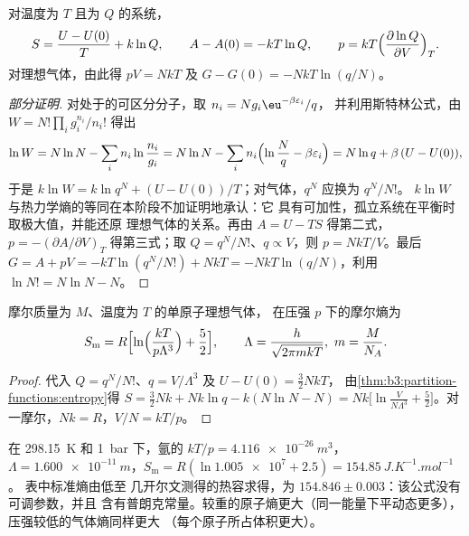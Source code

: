\begin{theorem}[熵与其他函数]\label{thm:b3:partition-functions:entropy}
对温度为 $T$ 且为 $Q$ 的系统，
\[
  S = \frac{U - U(0)}{T} + k\ln Q, \qquad A - A(0) = -kT\ln Q, \qquad
  p = kT\Bigl(\frac{\partial\ln Q}{\partial V}\Bigr)_T .
\]
对理想气体，由此得 $pV = NkT$ 及 $G - G(0) = -NkT\ln(q/N)$。
\end{theorem}

\begin{proof}[部分证明]
对处于的可区分分子，取 $n_i = Ng_i\eu^{-\beta\varepsilon_i}/q$，
并利用斯特林公式，由 $W = N!\prod_ig_i^{n_i}/n_i!$ 得出
\[
  \ln W = N\ln N - \sum_in_i\ln\frac{n_i}{g_i} = N\ln N - \sum_in_i\Bigl(\ln\frac Nq - \beta\varepsilon_i\Bigr)
        = N\ln q + \beta\,(U - U(0)),
\]
于是 $k\ln W = k\ln q^N + (U - U(0))/T$；对气体，$q^N$ 应换为 $q^N/N!$。
$k\ln W$ 与热力学熵的等同在本阶段不加证明地承认：它
具有可加性，孤立系统在平衡时取极大值，并能还原
理想气体的关系。再由 $A = U - TS$ 得第二式，$p =
-(\partial A/\partial V)_T$ 得第三式；取 $Q = q^N/N!$、$q \propto V$，则 $p = NkT/V$。最后
$G = A + pV = -kT\ln(q^N/N!) + NkT = -NkT\ln(q/N)$，利用 $\ln N! = N\ln N - N$。
\end{proof}

\begin{theorem}\label{thm:b3:partition-functions:sackur-tetrode}
摩尔质量为 $M$、温度为 $T$ 的单原子理想气体，
在压强 $p$ 下的摩尔熵为
\[
  S_{\mathrm m} = R\Bigl[\ln\Bigl(\frac{kT}{p\Lambda^3}\Bigr) + \frac52\Bigr],
  \qquad \Lambda = \frac{h}{\sqrt{2\pi mkT}},\ m = \frac{M}{N_A}.
\]
\end{theorem}

\begin{proof}
代入 $Q = q^N/N!$、$q = V/\Lambda^3$ 及 $U - U(0) = \frac32NkT$，
由\cref{thm:b3:partition-functions:entropy}得 $S = \frac32Nk + Nk\ln q - k(N\ln N - N) =
Nk\bigl[\ln\frac{V}{N\Lambda^3} + \frac52\bigr]$。对一摩尔，$Nk = R$，$V/N = kT/p$。
\end{proof}

在 \qty{298.15}{K} 和 \qty{1}{bar} 下，氩的 $kT/p = \qty{4.116e-26}{m^3}$，$\Lambda =
\qty{1.600e-11}{m}$，$S_{\mathrm m} = R(\ln\num{1.005e7} + 2.5) = \qty{154.85}{J.K^{-1}.mol^{-1}}$。
表中标准熵由低至
几开尔文测得的热容求得，为 $154.846 \pm 0.003$：该公式没有可调参数，并且
含有普朗克常量。较重的原子熵更大（同一能量下平动态更多），
压强较低的气体熵同样更大
（每个原子所占体积更大）。

